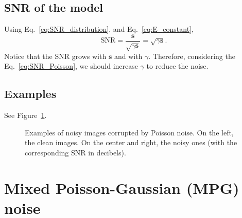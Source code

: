 \subsection{\gls{SNR} of the model}
Using Eq.~\ref{eq:SNR_distribution}, and Eq.~\ref{eq:E_constant}, %
\begin{equation}
  \text{SNR} = \frac{\mathbf{s}}{\sqrt{\gamma\mathbf{s}}} = \sqrt{\gamma\mathbf{s}}.
  \label{eq:SNR_Poisson}
\end{equation}
Notice that the SNR grows with $\mathbf{s}$ and with
$\gamma$. Therefore, considering the Eq.~\ref{eq:SNR_Poisson}, we should increase
$\gamma$ to reduce the noise.

\subsection*{Examples}

See Figure~\ref{fig:Poisson_examples}.

\begin{figure}
  \centering
  \caption{Examples of noisy images corrupted by Poisson noise. On the
    left, the clean images. On the center and right, the noisy ones (with the
    corresponding \gls{SNR} in
    decibels). \label{fig:Poisson_examples}}
\end{figure}


\section{Mixed Poisson-Gaussian (MPG) noise}

